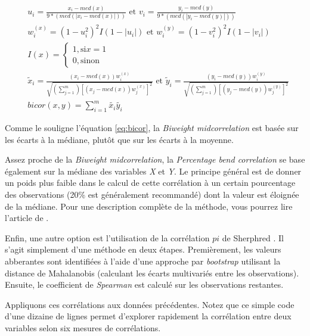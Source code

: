 \documentclass[
  11pt,
  french,
]{book}
\begin{document}
\begin{equation}
\begin{aligned}
&u_{i} = \frac{x_{i} - med(x)}{9 * (med(|x_{i} - med(x)|))} \text{ et } v_{i} = \frac{y_{i} - med(y)}{9 * (med(|y_{i} - med(y)|))}\\
&w_{i}^{(x)} = (1 - u_{i}^2)^2 I(1 - |u_{i}|) \text{ et } w_{i}^{(y)} = (1 - v_{i}^2)^2 I(1 - |v_{i}|)\\
&I(x) = 
\begin{cases}
1, \text{si} x = 1\\
0, \text{sinon}
\end{cases}\\
&\tilde{x}_{i} = \frac{(x_{i} - med(x))w_{i}^{(x)}}{\sqrt{(\sum_{j=1}^m)[(x_{j} - med(x))w_{j}^{(x)}]^2}} \text{ et } \tilde{y}_{i} = \frac{(y_{i} - med(y))w_{i}^{(y)}}{\sqrt{(\sum_{j=1}^m)[(y_{j} - med(y))w_{j}^{(y)}]^2}}\\
&bicor(x,y) = \sum_{i=1}^m \tilde{x_i}\tilde{y_i}
\end{aligned}
\label{eq:bicor}
\end{equation}

Comme le souligne l'équation \eqref{eq:bicor}, la \emph{Biweight midcorrelation} est basée sur les écarts à la médiane, plutôt que sur les écarts à la moyenne.

Assez proche de la \emph{Biweight midcorrelation}, la \emph{Percentage bend correlation} se base également sur la médiane des variables \emph{X} et \emph{Y}. Le principe général est de donner un poids plus faible dans le calcul de cette corrélation à un certain pourcentage des observations (20\% est généralement recommandé) dont la valeur est éloignée de la médiane. Pour une description complète de la méthode, vous pourrez lire l'article de \citet{wilcox1994percentage}.

Enfin, une autre option est l'utilisation de la corrélation \(pi\) de Sherphred \citep{Schwarzkopf2012}. Il s'agit simplement d'une méthode en deux étapes. Premièrement, les valeurs abberantes sont identifiées à l'aide d'une approche par \emph{bootstrap} utilisant la distance de Mahalanobis (calculant les écarts multivariés entre les observations). Ensuite, le coefficient de \emph{Spearman} est calculé sur les observations restantes.

Appliquons ces corrélations aux données précédentes. Notez que ce simple code d'une dizaine de lignes permet d'explorer rapidement la corrélation entre deux variables selon six mesures de corrélations.
\end{document}
